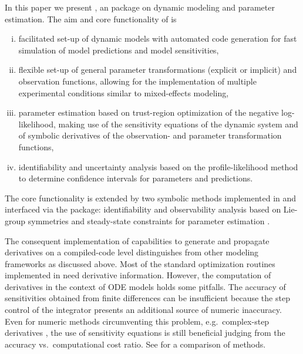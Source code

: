 \documentclass[article]{jss}
\begin{document}
In this paper we present , an  package on dynamic modeling and parameter estimation. The aim and core functionality of  is
\begin{enumerate}[(i)]
	\item facilitated set-up of dynamic models with automated  code generation for fast simulation of model predictions and model sensitivities,
	\item flexible set-up of general parameter transformations (explicit or implicit) and observation functions, allowing for the implementation of multiple experimental conditions similar to mixed-effects modeling,
	\item parameter estimation based on trust-region optimization of the negative log-likelihood, making use of the sensitivity equations of the dynamic system and of symbolic derivatives of the observation- and parameter transformation functions,
	\item identifiability and uncertainty analysis based on the profile-likelihood method to determine confidence intervals for parameters and predictions.
\end{enumerate}

The core functionality is extended by two symbolic methods implemented in  and interfaced via the  package: identifiability and observability analysis based on Lie-group symmetries \citep{merkt2015higher} and steady-state constraints for parameter estimation \citep{rosenblatt2016customized}.

The consequent implementation of capabilities to generate and propagate derivatives on a compiled-code level distinguishes  from other modeling frameworks as discussed above. Most of the standard optimization routines implemented in  need derivative information. However, the computation of derivatives in the context of ODE models holds some pitfalls. The accuracy of sensitivities obtained from finite differences can be insufficient because the step control of the integrator presents an additional source of numeric inaccuracy. Even for numeric methods circumventing this problem, e.g.~complex-step derivatives \citep{squire1998using}, the use of sensitivity equations is still beneficial judging from the accuracy vs.~computational cost ratio. See \citep{raue2013lessons} for a comparison of methods.
\end{document}

